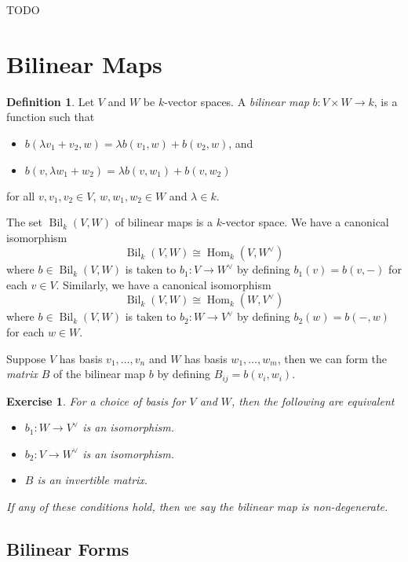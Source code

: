 \documentclass[12pt]{article}
\theoremstyle{plain}
\newtheorem{exercise}[theorem]{Exercise}
\theoremstyle{definition}
\newtheorem{definition}[theorem]{Definition}
\theoremstyle{remark}
\numberwithin{equation}{section}
\begin{document}
TODO

\section{Bilinear Maps}

\begin{definition}
Let $V$ and $W$ be $k$-vector spaces.
A \emph{bilinear map} $b: V \times W \to k$,
is a function such that
\begin{itemize}
\item $b(\lambda v_1+v_2,w) = \lambda b(v_1,w) + b(v_2,w)$, and
\item $b(v,\lambda w_1+w_2) = \lambda b(v,w_1) + b(v,w_2)$
\end{itemize}
for all $v,v_1,v_2 \in V$, $w,w_1,w_2 \in W$ and $\lambda \in k$.
\end{definition}

The set $\operatorname{Bil}_k(V,W)$ of bilinear maps is a $k$-vector
space.
We have a canonical isomorphism
\[
\operatorname{Bil}_k(V,W) \cong
\operatorname{Hom}_k(V,W^\vee)
\]
where $b \in \operatorname{Bil}_k(V,W)$ is taken to $b_1 : V \to W^\vee$
by defining $b_1(v) = b(v,-)$ for each $v \in V$.
Similarly, we have a canonical isomorphism
\[
\operatorname{Bil}_k(V,W) \cong
\operatorname{Hom}_k(W,V^\vee)
\]
where $b \in \operatorname{Bil}_k(V,W)$ is taken to $b_2 : W \to V^\vee$
by defining $b_2(w) = b(-,w)$ for each $w \in W$.

Suppose $V$ has basis $v_1,\ldots,v_n$ and $W$ has basis $w_1,\ldots, w_m$,
then we can form the \emph{matrix} $B$ of the bilinear map $b$ by defining
$B_{ij} = b(v_i,w_i)$.

\begin{exercise}
For a choice of basis for $V$ and $W$, then the following are equivalent
\begin{itemize}
\item $b_1 : W \to V^\vee$ is an isomorphism.
\item $b_2 : V \to W^\vee$ is an isomorphism.
\item $B$ is an invertible matrix.
\end{itemize}
If any of these conditions hold, then we say the bilinear map
is \emph{non-degenerate}.
\end{exercise}

\subsection{Bilinear Forms}
\end{document}
